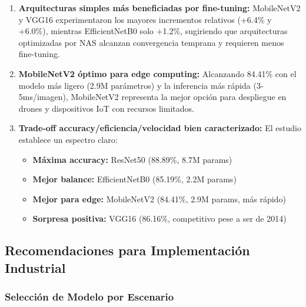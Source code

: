 \documentclass[11pt, a4paper]{article}
\begin{document}
\begin{enumerate}
    \item \textbf{Arquitecturas simples más beneficiadas por fine-tuning:} MobileNetV2 y VGG16 experimentaron los mayores incrementos relativos (+6.4\% y +6.0\%), mientras EfficientNetB0 solo +1.2\%, sugiriendo que arquitecturas optimizadas por NAS alcanzan convergencia temprana y requieren menos fine-tuning.
    
    \item \textbf{MobileNetV2 óptimo para edge computing:} Alcanzando 84.41\% con el modelo más ligero (2.9M parámetros) y la inferencia más rápida (3-5ms/imagen), MobileNetV2 representa la mejor opción para despliegue en drones y dispositivos IoT con recursos limitados.
    
    \item \textbf{Trade-off accuracy/eficiencia/velocidad bien caracterizado:} El estudio establece un espectro claro:
    \begin{itemize}
        \item \textbf{Máxima accuracy:} ResNet50 (88.89\%, 8.7M params)
        \item \textbf{Mejor balance:} EfficientNetB0 (85.19\%, 2.2M params)
        \item \textbf{Mejor para edge:} MobileNetV2 (84.41\%, 2.9M params, más rápido)
        \item \textbf{Sorpresa positiva:} VGG16 (86.16\%, competitivo pese a ser de 2014)
    \end{itemize}
\end{enumerate}

\subsection{Recomendaciones para Implementación Industrial}

\subsubsection{Selección de Modelo por Escenario}
\end{document}
